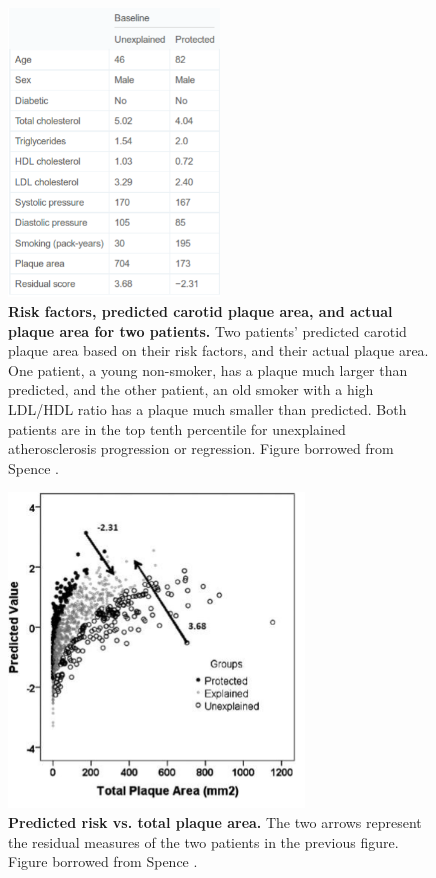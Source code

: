 \begin{figure}[h]
\begin{center}
\includegraphics[width=0.5\textwidth]{risk_factors.png}
\caption{\textbf{Risk factors, predicted carotid plaque area, and actual plaque area for two patients.} Two patients’ predicted carotid plaque area based on their risk factors, and their actual plaque area. One patient, a young non-smoker, has a plaque much larger than predicted, and the other patient, an old smoker with a high LDL/HDL ratio has a plaque much smaller than predicted. Both patients are in the top tenth percentile for unexplained atherosclerosis progression or regression. Figure borrowed from Spence \cite{spence2012genetics}.}
\end{center}
\end{figure}

\begin{figure}[h]
\begin{center}
\includegraphics[width=0.7\textwidth]{risk_vs_plaque.png}
\caption{\textbf{Predicted risk vs. total plaque area.} The two arrows represent the residual measures of the two patients in the previous figure. Figure borrowed from Spence \cite{spence2012genetics}.}
\end{center}
\end{figure}

